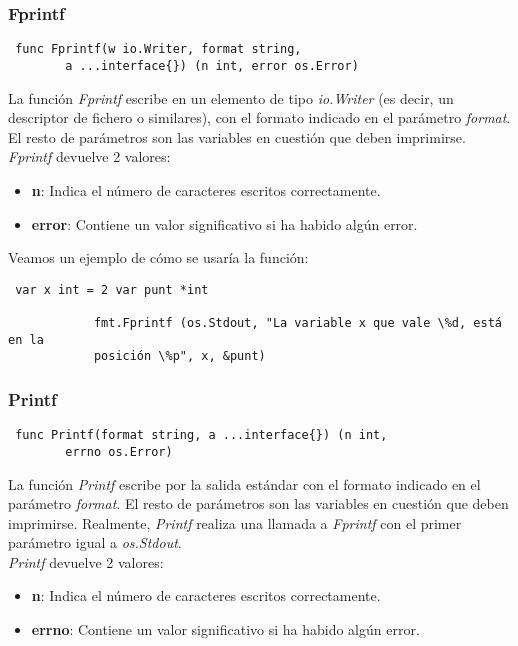 	\clearpage
	
		\subsubsection{Fprintf}
		
		\begin{verbatim} func Fprintf(w io.Writer, format string,
		a ...interface{}) (n int, error os.Error) \end{verbatim}
		
		La función \textit{Fprintf} escribe en un elemento de tipo
		\textit{io.Writer} (es decir, un descriptor de fichero o similares), con
		el formato indicado en el parámetro \textit{format}. El resto de
		parámetros son las variables en cuestión que deben imprimirse.\\
		
		\textit{Fprintf} devuelve 2 valores: \begin{itemize} \item \textbf{n}:
		Indica el número de caracteres escritos correctamente.  \item
		\textbf{error}: Contiene un valor significativo si ha habido algún
		error.  \end{itemize}
		
		Veamos un ejemplo de cómo se usaría la función:
		
		\begin{verbatim} var x int = 2 var punt *int
		
			fmt.Fprintf (os.Stdout, "La variable x que vale \%d, está en la
			posición \%p", x, &punt) \end{verbatim}
		
		\subsubsection{Printf}
		
		\begin{verbatim} func Printf(format string, a ...interface{}) (n int,
		errno os.Error) \end{verbatim}
		
		La función \textit{Printf} escribe por la salida estándar con el formato
		indicado en el parámetro \textit{format}. El resto de parámetros son las
		variables en cuestión que deben imprimirse. Realmente, \textit{Printf}
		realiza una llamada a \textit{Fprintf} con el primer parámetro igual
		a \textit{os.Stdout}.\\
		
		\textit{Printf} devuelve 2 valores: \begin{itemize} \item \textbf{n}:
		Indica el número de caracteres escritos correctamente.  \item
		\textbf{errno}: Contiene un valor significativo si ha habido algún
		error.  \end{itemize}
		
